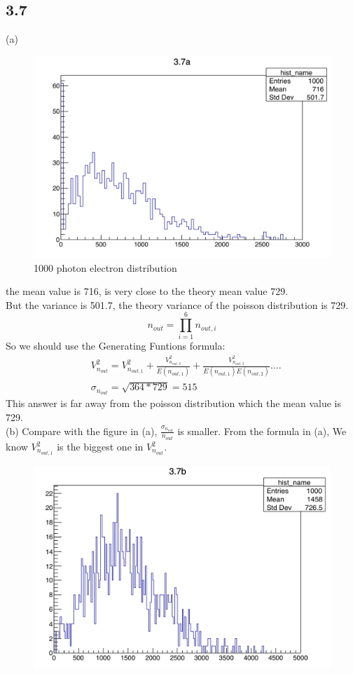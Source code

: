 \documentclass{article}
\begin{document}
\begin{CJK*}{GBK}{song}
\section{3.7}
(a)
\begin{figure}[H]
\centerline{\includegraphics[scale=0.4]{3.7a.png}}
\caption{1000 photon electron distribution}
\label{fig:label}
\end{figure}
the mean value is 716, is very close to the theory mean value 729.\\ 
But the variance is 501.7, the theory variance of the poisson distribution is 729.
\begin{equation}
n_{out}=\prod_{i=1}^6n_{out,i}
\end{equation}
So we should use the Generating Funtions formula:
\begin{equation}
\begin{aligned}
&V^2_{n_{out}}=V^2_{n_{out,1}}+\frac{V^2_{n_{out,2}}}{E(n_{out,1})}+\frac{V^2_{n_{out,3}}}{E(n_{out,1})E(n_{out,2})}....\\
&\sigma_{n_{out}}=\sqrt{364*729}=515
\end{aligned}
\end{equation}
This answer is far away from the poisson distribution which the mean value is 729.\\
(b)
Compare with the figure in (a), $\frac{\sigma_{n_{out}}}{\bar{n}_{out}}$ is smaller. From the formula in (a), We know $V^2_{n_{out,1}}$ is the biggest one in $V^2_{n_{out}}$.
\begin{figure}[H]
\centerline{\includegraphics[scale=0.4]{3.7b.png}}

\end{figure}
\end{CJK*}
\end{document}
